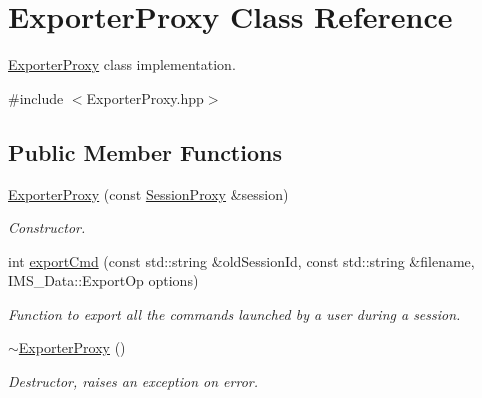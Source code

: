 \hypertarget{classExporterProxy}{
\section{ExporterProxy Class Reference}
\label{classExporterProxy}
}


\hyperlink{classExporterProxy}{ExporterProxy} class implementation.  




{\ttfamily \#include $<$ExporterProxy.hpp$>$}

\subsection*{Public Member Functions}
\begin{DoxyCompactItemize}
\item 
\hyperlink{classExporterProxy_a4acc109bee093857bbf9c351655c83a4}{ExporterProxy} (const \hyperlink{classSessionProxy}{SessionProxy} \&session)
\begin{DoxyCompactList}\small\item\em Constructor. \item\end{DoxyCompactList}\item 
int \hyperlink{classExporterProxy_a5826c1c6b3b881705f6069f7ba1ecfd3}{exportCmd} (const std::string \&oldSessionId, const std::string \&filename, IMS\_\-Data::ExportOp options)
\begin{DoxyCompactList}\small\item\em Function to export all the commands launched by a user during a session. \item\end{DoxyCompactList}\item 
\hypertarget{classExporterProxy_afc569c8190f2e437a2aa43ea8bbac3c4}{
\hyperlink{classExporterProxy_afc569c8190f2e437a2aa43ea8bbac3c4}{$\sim$ExporterProxy} ()}
\label{classExporterProxy_afc569c8190f2e437a2aa43ea8bbac3c4}

\begin{DoxyCompactList}\small\item\em Destructor, raises an exception on error. \item\end{DoxyCompactList}\end{DoxyCompactItemize}
